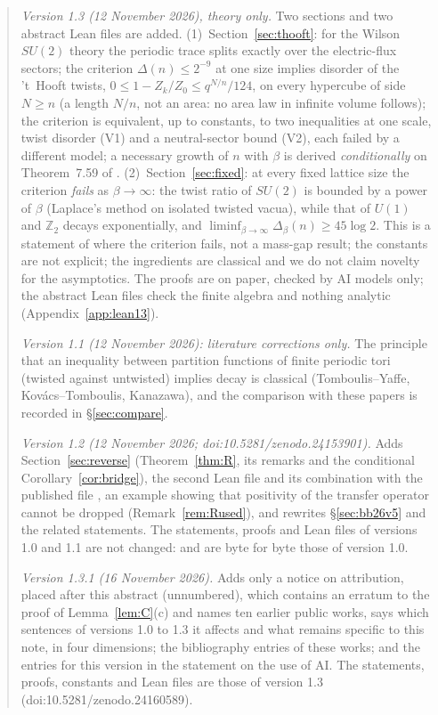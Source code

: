 \documentclass[11pt,a4paper]{article}
\theoremstyle{plain}
\theoremstyle{definition}
\theoremstyle{remark}
\numberwithin{equation}{section}
\newcommand{\Z}{\mathbb{Z}}
\begin{document}
\begin{abstract}
\emph{Version 1.3 (12 November 2026), theory only.} Two sections and two abstract Lean files are added. (1)~Section~\ref{sec:thooft}: for the Wilson $SU(2)$ theory the periodic trace splits exactly over the electric-flux sectors; the criterion $\Delta(n)\le2^{-9}$ at one size implies disorder of the 't~Hooft twists, $0\le1-Z_k/Z_0\le q^{N/n}/124$, on every hypercube of side $N\ge n$ (a length $N/n$, not an area: no area law in infinite volume follows); the criterion is equivalent, up to constants, to two inequalities at one scale, twist disorder (V1) and a neutral-sector bound (V2), each failed by a different model; a necessary growth of $n$ with $\beta$ is derived \emph{conditionally} on Theorem~7.59 of \cite{BB26v5}. (2)~Section~\ref{sec:fixed}: at every fixed lattice size the criterion \emph{fails} as $\beta\to\infty$: the twist ratio of $SU(2)$ is bounded by a power of $\beta$ (Laplace's method on isolated twisted vacua), while that of $U(1)$ and $\Z_2$ decays exponentially, and $\liminf_{\beta\to\infty}\Delta_\beta(n)\ge45\log2$. This is a statement of where the criterion fails, not a mass-gap result; the constants are not explicit; the ingredients are classical and we do not claim novelty for the asymptotics. The proofs are on paper, checked by AI models only; the abstract Lean files check the finite algebra and nothing analytic (Appendix~\ref{app:lean13}).

\emph{Version 1.1 (12 November 2026): literature corrections only.} The principle that an inequality between partition functions of finite periodic tori (twisted against untwisted) implies decay is classical (Tomboulis--Yaffe, Kov\'acs--Tomboulis, Kanazawa), and the comparison with these papers is recorded in \S\ref{sec:compare}.

\emph{Version 1.2 (12 November 2026; doi:10.5281/zenodo.24153901).} Adds Section~\ref{sec:reverse} (Theorem~\ref{thm:R}, its remarks and the conditional Corollary~\ref{cor:bridge}), the second Lean file  and its combination with the published file , an example showing that positivity of the transfer operator cannot be dropped (Remark~\ref{rem:Rused}), and rewrites \S\ref{sec:bb26v5} and the related statements. The statements, proofs and Lean files of versions 1.0 and 1.1 are not changed:  and  are byte for byte those of version 1.0.

\emph{Version 1.3.1 (16 November 2026).} Adds only a notice on attribution, placed after this abstract (unnumbered), which contains an erratum to the proof of Lemma~\ref{lem:C}(c) and names ten earlier public works, says which sentences of versions 1.0 to 1.3 it affects and what remains specific to this note, in four dimensions; the bibliography entries of these works; and the entries for this version in the statement on the use of AI. The statements, proofs, constants and Lean files are those of version 1.3 (doi:10.5281/zenodo.24160589).
\end{abstract}
\end{document}
